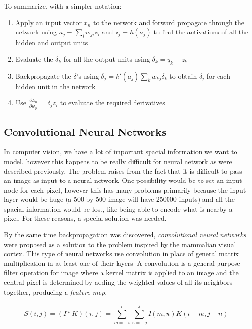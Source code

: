 \documentclass{article}
\begin{document}
To summarize, with a simpler notation:

\begin{enumerate}
\def\labelenumi{\arabic{enumi}.}
\tightlist
\item
  Apply an input vector \(x_n\) to the network and forward propagate
  through the network using \(a_j=\sum_iw_{ji}z_i\) and \(z_j=h(a_j)\)
  to find the activations of all the hidden and output units
\item
  Evaluate the \(\delta_k\) for all the output units using
  \(\delta_k=y_k-z_k\)
\item
  Backpropagate the \(\delta\)'s using
  \(\delta_j=h'(a_j)\sum_k w_{kj}\delta_k\) to obtain \(\delta_j\) for
  each hidden unit in the network
\item
  Use \(\frac{\partial E_n}{\partial w_{ji}}=\delta_jz_i\) to evaluate
  the required derivatives
\end{enumerate}

\subsection{Convolutional Neural
Networks}\label{convolutional-neural-networks}

In computer vision, we have a lot of important spacial information we
want to model, however this happens to be really difficult for neural
network as were described previously. The problem raises from the fact
that it is difficult to pass an image as input to a neural network. One
possibility would be to set an input node for each pixel, however this
has many problems primarily because the input layer would be huge (a 500
by 500 image will have 250000 inputs) and all the spacial information
would be lost, like being able to encode what is nearby a pixel. For
these reasons, a special solution was needed.

By the same time backpropagation was discovered, \emph{convolutional
neural networks} were proposed as a solution to the problem inspired by
the mammalian visual cortex. This type of neural networks use
convolution in place of general matrix multiplication in at least one of
their layers. A convolution is a general purpose filter operation for
image where a kernel matrix is applied to an image and the central pixel
is determined by adding the weighted values of all its neighbors
together, producing a \emph{feature map}.

\[S(i, j) = (I*K)(i, j) = \sum_{m=-i}^i\sum_{n=-j}^jI(m, n)K(i-m,j-n)\]
\end{document}
